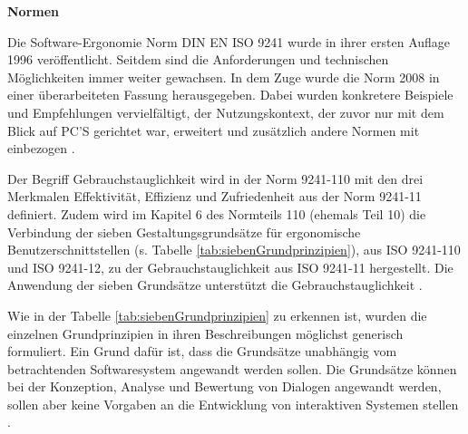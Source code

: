\textbf{Normen}

Die Software-Ergonomie Norm \gls{DIN} \gls{EN} \gls{ISO} 9241 wurde in ihrer ersten Auflage 1996 veröffentlicht. Seitdem sind die Anforderungen und technischen Möglichkeiten immer weiter gewachsen. In dem Zuge wurde die Norm 2008 in einer überarbeiteten Fassung herausgegeben. Dabei wurden konkretere Beispiele und Empfehlungen vervielfältigt, der Nutzungskontext, der zuvor nur mit dem Blick auf PC'S gerichtet war, erweitert und zusätzlich andere Normen mit einbezogen \citep[vgl.][]{Schneider2008}.

Der Begriff Gebrauchstauglichkeit wird in der Norm 9241-110 mit den drei Merkmalen Effektivität, Effizienz und Zufriedenheit aus der Norm 9241-11 definiert. Zudem wird im Kapitel 6 des Normteils 110 (ehemals Teil 10) die Verbindung der sieben Gestaltungsgrundsätze für ergonomische Benutzerschnittstellen (s. Tabelle \ref{tab:siebenGrundprinzipien}), aus ISO 9241-110 und ISO 9241-12, zu der Gebrauchstauglichkeit aus ISO 9241-11 hergestellt. Die Anwendung der sieben Grundsätze unterstützt die Gebrauchstauglichkeit \citep[vgl.][Kap. 6]{ISO9241-110}.

Wie in der Tabelle \ref{tab:siebenGrundprinzipien} zu erkennen ist, wurden die einzelnen Grundprinzipien in ihren Beschreibungen möglichst generisch formuliert. Ein Grund dafür ist, dass die Grundsätze unabhängig vom betrachtenden Softwaresystem angewandt werden sollen. Die Grundsätze können bei der Konzeption, Analyse und Bewertung von Dialogen angewandt werden, sollen aber keine Vorgaben an die Entwicklung von interaktiven Systemen stellen \citep[vgl.][Kap. 4.1]{ISO9241-110}.

